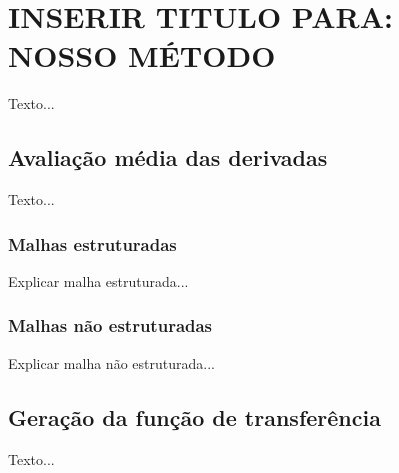 
\chapter{INSERIR TITULO PARA: NOSSO MÉTODO}
\label{my}

	Texto...

\section{Avaliação média das derivadas}
\label{my.deriv}
	Texto...
    
\subsection{Malhas estruturadas}
\label{my.struct}
	Explicar malha estruturada...

\subsection{Malhas não estruturadas}
\label{my.nonstruct}
	Explicar malha não estruturada...

\section{Geração da função de transferência}
\label{my.tf}
	Texto...